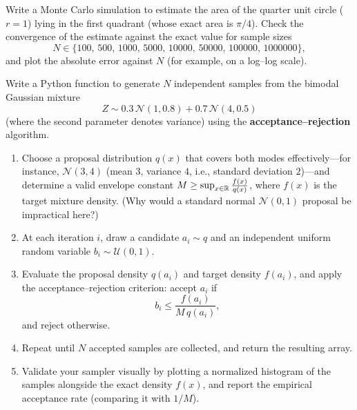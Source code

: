 \begin{problem}
    Write a Monte Carlo simulation to estimate the area of the quarter unit circle ($r = 1$) lying in the first quadrant (whose exact area is $\pi/4$). Check the convergence of the estimate against the exact value for sample sizes
    \[
    N \in \{100,\, 500,\, 1000,\, 5000,\, 10000,\, 50000,\, 100000,\, 1000000\},
    \]
    and plot the absolute error against $N$ (for example, on a log--log scale).
\end{problem}

\begin{problem}
    Write a Python function to generate $N$ independent samples from the bimodal Gaussian mixture
    \[
    Z \sim 0.3\,\mathcal{N}(1, 0.8) + 0.7\,\mathcal{N}(4, 0.5)
    \]
    (where the second parameter denotes variance) using the \textbf{acceptance--rejection} algorithm.
    \begin{enumerate}
        \item Choose a proposal distribution $q(x)$ that covers both modes effectively—for instance, $\mathcal{N}(3, 4)$ (mean $3$, variance $4$, i.e., standard deviation $2$)—and determine a valid envelope constant $M \geq \sup_{x \in \mathbb{R}} \frac{f(x)}{q(x)}$, where $f(x)$ is the target mixture density. (Why would a standard normal $\mathcal{N}(0, 1)$ proposal be impractical here?)
        \item At each iteration $i$, draw a candidate $a_i \sim q$ and an independent uniform random variable $b_i \sim \mathcal{U}(0, 1)$.
        \item Evaluate the proposal density $q(a_i)$ and target density $f(a_i)$, and apply the acceptance--rejection criterion: accept $a_i$ if
        \[
        b_i \leq \frac{f(a_i)}{M\,q(a_i)},
        \]
        and reject otherwise.
        \item Repeat until $N$ accepted samples are collected, and return the resulting array.
        \item Validate your sampler visually by plotting a normalized histogram of the samples alongside the exact density $f(x)$, and report the empirical acceptance rate (comparing it with $1/M$).
    \end{enumerate}
\end{problem}

